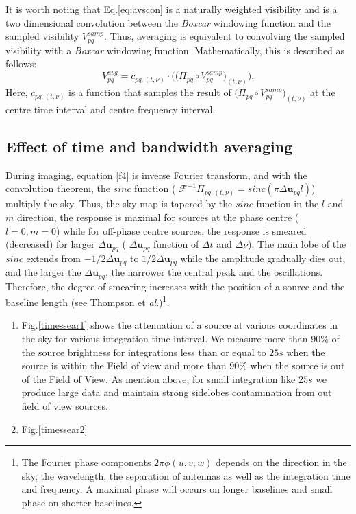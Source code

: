 \documentclass[useAMS,usenatbib]{mn2e}
\begin{document}
It is worth noting that Eq.\ref{eq:avscon} is a naturally weighted visibility and is a two dimensional convolution between the 
\textit{Boxcar} windowing function and the sampled visibility $V_{pq}^{samp}$. Thus, averaging is equivalent to convolving the 
sampled 
visibility with a \textit{Boxcar} windowing function. Mathematically, this is described as follows:
\begin{equation}
 V_{pq}^{avg}=c_{pq,(t,\nu)}\cdot\Bigg(\Big(\Pi_{pq}\circ V_{pq}^{samp}\Big)_{(t,\nu)}\Bigg). \label{f4}
\end{equation}
Here, $c_{pq,(t,\nu)}$ is a function that samples the result of $\Big(\Pi_{pq}\circ V_{pq}^{samp}\Big)_{(t,\nu)}$ at 
the centre time interval and centre frequency interval.
\subsection{Effect of time and bandwidth averaging}
During imaging, equation \ref{f4} is inverse Fourier transform, and with the convolution theorem, the $sinc$ function ( 
$\mathcal{F}^{-1}\Pi_{pq, (t,\nu)}=sinc(\pi\Delta \mathbf{u}_{pq} l)$) multiply the sky. Thus, the 
sky map is tapered by the $sinc$ function in the $l$ and $m$ direction, the response is maximal for sources at the phase centre ( 
$l=0,m=0$) while for off-phase centre sources, the response is smeared (decreased) for larger $\Delta \mathbf{u}_{pq}$ ( 
$\Delta\mathbf{u}_{pq}$ function of $\Delta t$ and $\Delta \nu$). The main lobe of the $sinc$ extends from 
$-1/2\Delta \mathbf{u}_{pq}$ to $1/2\Delta \mathbf{u}_{pq}$ while the amplitude gradually dies out, and the larger the $\Delta 
\mathbf{u}_{pq}$, the narrower the central peak and the oscillations. Therefore, the degree of smearing increases with the position of a 
source and the baseline length (see Thompson et \textit{al}.)\footnote{The Fourier phase components $2\pi \phi(u,v,w)$ depends on the 
direction in the sky, the wavelength, the separation of antennas as well as the integration time and frequency. A maximal phase will 
occurs on longer baselines and small phase on shorter baselines.}.
\begin{enumerate}
 \item Fig.\ref{timessear1} shows the attenuation of a source at various coordinates in the sky for various integration time interval. We 
measure  more than $90\%$ of the source brightness for integrations less than or equal to $25s$ when the source is within the 
       Field of view and more than $90\%$ when the source is out of the Field of View. As mention above, for small integration like $25s$ 
       we produce large data  and maintain strong sidelobes contamination from out field of view sources.
  \item Fig.\ref{timessear2} 
\end{enumerate}
\end{document}
